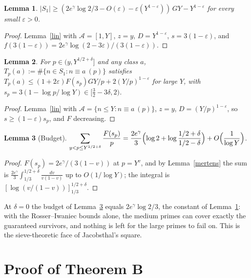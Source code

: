 \documentclass[11pt]{amsart}
\newtheorem{lemma}{Lemma}[section]
\newcommand{\eps}{\varepsilon}
\begin{document}
\begin{lemma}\label{lower}
$|S_1|\ge(2e^{\gamma}\log2/3-O(\eps)-\eps(Y^{1-\eps}))\,GY-Y^{1-\eps}$ for every small $\eps>0$.
\end{lemma}
\begin{proof}
Lemma~\ref{lin} with $\mathcal A=[1,Y]$, $z=y$, $D=Y^{1-\eps}$, $s=3(1-\eps)$, and $f(3(1-\eps))=2e^\gamma\log(2-3\eps)/(3(1-\eps))$.
\end{proof}

\begin{lemma}\label{upper}
For $p\in(y,Y^{1/2+\delta}]$ and any class $a$, $T_p(a):=\#\{n\in S_1:n\equiv a\ (p)\}$ satisfies $T_p(a)\le(1+2\eps)F(s_p)GY/p+2(Y/p)^{1-\eps}$ for large $Y$, with $s_p=3(1-\log p/\log Y)\in[\tfrac32-3\delta,2)$.
\end{lemma}
\begin{proof}
Lemma~\ref{lin} with $\mathcal A=\{n\le Y:n\equiv a\ (p)\}$, $z=y$, $D=(Y/p)^{1-\eps}$, so $s\ge(1-\eps)s_p$, and $F$ decreasing.
\end{proof}

\begin{lemma}[Budget]\label{budget}
$\displaystyle\sum_{y<p\le Y^{1/2+\delta}}\frac{F(s_p)}{p}=\frac{2e^{\gamma}}{3}\Bigl(\log2+\log\frac{1/2+\delta}{1/2-\delta}\Bigr)+O\Bigl(\frac1{\log Y}\Bigr)$.
\end{lemma}
\begin{proof}
$F(s_p)=2e^\gamma/(3(1-v))$ at $p=Y^{v}$, and by Lemma~\ref{mertens} the sum is $\frac{2e^{\gamma}}{3}\int_{1/3}^{1/2+\delta}\frac{dv}{v(1-v)}$ up to $O(1/\log Y)$; the integral is $[\log(v/(1-v))]_{1/3}^{1/2+\delta}$.
\end{proof}

At $\delta=0$ the budget of Lemma~\ref{budget} equals $2e^\gamma\log2/3$, the constant of Lemma~\ref{lower}: with the Rosser--Iwaniec bounds alone, the medium primes can cover exactly the guaranteed survivors, and nothing is left for the large primes to fail on. This is the sieve-theoretic face of Jacobsthal's square.

\section{Proof of Theorem B}
\end{document}
